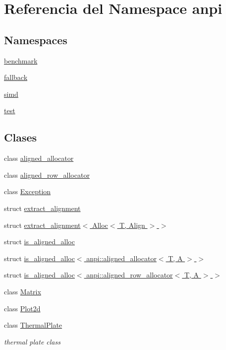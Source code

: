\hypertarget{namespaceanpi}{}\section{Referencia del Namespace anpi}
\label{namespaceanpi}
\subsection*{Namespaces}
\begin{DoxyCompactItemize}
\item 
 \hyperlink{namespaceanpi_1_1benchmark}{benchmark}
\item 
 \hyperlink{namespaceanpi_1_1fallback}{fallback}
\item 
 \hyperlink{namespaceanpi_1_1simd}{simd}
\item 
 \hyperlink{namespaceanpi_1_1test}{test}
\end{DoxyCompactItemize}
\subsection*{Clases}
\begin{DoxyCompactItemize}
\item 
class \hyperlink{classanpi_1_1aligned__allocator}{aligned\+\_\+allocator}
\item 
class \hyperlink{classanpi_1_1aligned__row__allocator}{aligned\+\_\+row\+\_\+allocator}
\item 
class \hyperlink{classanpi_1_1Exception}{Exception}
\item 
struct \hyperlink{structanpi_1_1extract__alignment}{extract\+\_\+alignment}
\item 
struct \hyperlink{structanpi_1_1extract__alignment_3_01Alloc_3_01T_00_01Align_01_4_01_4}{extract\+\_\+alignment$<$ Alloc$<$ T, Align $>$ $>$}
\item 
struct \hyperlink{structanpi_1_1is__aligned__alloc}{is\+\_\+aligned\+\_\+alloc}
\item 
struct \hyperlink{structanpi_1_1is__aligned__alloc_3_01anpi_1_1aligned__allocator_3_01T_00_01A_01_4_01_4}{is\+\_\+aligned\+\_\+alloc$<$ anpi\+::aligned\+\_\+allocator$<$ T, A $>$ $>$}
\item 
struct \hyperlink{structanpi_1_1is__aligned__alloc_3_01anpi_1_1aligned__row__allocator_3_01T_00_01A_01_4_01_4}{is\+\_\+aligned\+\_\+alloc$<$ anpi\+::aligned\+\_\+row\+\_\+allocator$<$ T, A $>$ $>$}
\item 
class \hyperlink{classanpi_1_1Matrix}{Matrix}
\item 
class \hyperlink{classanpi_1_1Plot2d}{Plot2d}
\item 
class \hyperlink{classanpi_1_1ThermalPlate}{Thermal\+Plate}
\begin{DoxyCompactList}\small\item\em thermal plate class \end{DoxyCompactList}\end{DoxyCompactItemize}
